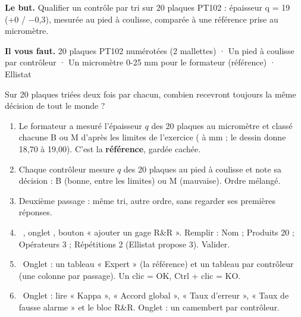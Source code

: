 \documentclass[10pt,a4paper]{article}
\begin{document}
\thispagestyle{fancy}
\begin{tcolorbox}[boite]\textbf{Le but.} Qualifier un contrôle par tri sur 20 plaques PT102 : épaisseur q = 19 (+0 / −0,3), mesurée au pied à coulisse, comparée à une référence prise au micromètre.\par\textbf{Il vous faut.} 20 plaques PT102 numérotées (2 mallettes) · Un pied à coulisse par contrôleur · Un micromètre 0-25 mm pour le formateur (référence) · Ellistat\end{tcolorbox}
\begin{tcolorbox}[pred]Sur 20 plaques triées deux fois par chacun, combien recevront toujours la même décision de tout le monde ?\reponse\end{tcolorbox}
\begin{enumerate}[label=\textcolor{cyan}{\textbf{\arabic*.}},leftmargin=15pt,itemsep=1.5pt]
\item Le formateur a mesuré l'épaisseur $q$ des 20 plaques au micromètre et classé chacune B ou M d'après les limites de l'exercice (\champ{18mm} à \champ{18mm} mm ; le dessin donne 18,70 à 19,00). C'est la \textbf{référence}, gardée cachée.
\item Chaque contrôleur mesure $q$ des 20 plaques au pied à coulisse et note sa décision : B (bonne, entre les limites) ou M (mauvaise). Ordre mélangé.
\item Deuxième passage : même tri, autre ordre, sans regarder ses premières réponses.
\item \tagE\ , onglet , bouton « ajouter un gage R\&R ». Remplir : Nom ; Produits 20 ; Opérateurs 3 ; Répétitions 2 (Ellistat propose 3). Valider.
\item \tagE\ Onglet  : un tableau « Expert » (la référence) et un tableau par contrôleur (une colonne par passage). Un clic = OK, Ctrl + clic = KO.
\item \tagE\ Onglet  : lire « Kappa », « Accord global », « Taux d'erreur », « Taux de fausse alarme » et le bloc R\&R. Onglet  : un camembert par contrôleur.
\end{enumerate}
\end{document}
